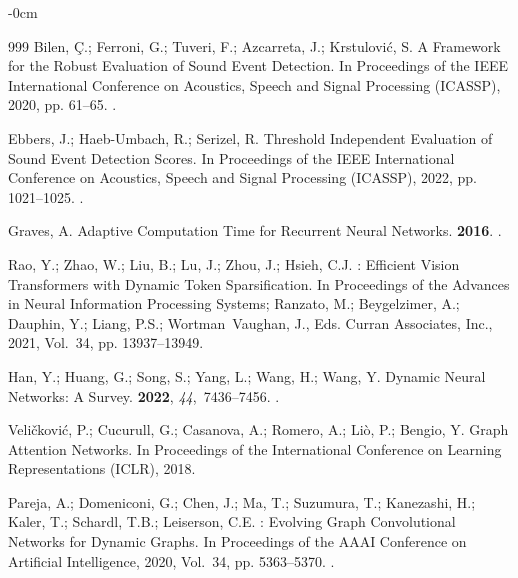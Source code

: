 \documentclass[algorithms,article,submit,pdftex,oneauthor]{Definitions/mdpi}
\begin{document}
\begin{adjustwidth}{-\extralength}{0cm}
\begin{thebibliography}{999}
Bilen, {\c{C}}.; Ferroni, G.; Tuveri, F.; Azcarreta, J.; Krstulovi{\'c}, S.
\newblock A Framework for the Robust Evaluation of Sound Event Detection.
\newblock In Proceedings of the IEEE International Conference on Acoustics,
  Speech and Signal Processing (ICASSP),  2020, pp. 61--65.
.

Ebbers, J.; Haeb-Umbach, R.; Serizel, R.
\newblock Threshold Independent Evaluation of Sound Event Detection Scores.
\newblock In Proceedings of the IEEE International Conference on Acoustics,
  Speech and Signal Processing (ICASSP),  2022, pp. 1021--1025.
.

Graves, A.
\newblock Adaptive Computation Time for Recurrent Neural Networks.
 {\bf 2016}.
.

Rao, Y.; Zhao, W.; Liu, B.; Lu, J.; Zhou, J.; Hsieh, C.J.
: Efficient Vision Transformers with Dynamic Token
  Sparsification.
\newblock In Proceedings of the Advances in Neural Information Processing
  Systems; Ranzato, M.; Beygelzimer, A.; Dauphin, Y.; Liang, P.S.;
  Wortman~Vaughan, J., Eds. Curran Associates, Inc.,  2021, Vol.~34, pp.
  13937--13949.

Han, Y.; Huang, G.; Song, S.; Yang, L.; Wang, H.; Wang, Y.
\newblock Dynamic Neural Networks: A Survey.
  {\bf 2022}, {\em 44},~7436--7456.
.

Veli{\v{c}}kovi{\'c}, P.; Cucurull, G.; Casanova, A.; Romero, A.; Li{\`o}, P.;
  Bengio, Y.
\newblock Graph Attention Networks.
\newblock In Proceedings of the International Conference on Learning
  Representations (ICLR),  2018.

Pareja, A.; Domeniconi, G.; Chen, J.; Ma, T.; Suzumura, T.; Kanezashi, H.;
  Kaler, T.; Schardl, T.B.; Leiserson, C.E.
: Evolving Graph Convolutional Networks for Dynamic
  Graphs.
\newblock In Proceedings of the AAAI Conference on Artificial Intelligence,
  2020, Vol.~34, pp. 5363--5370.
.


\end{thebibliography}
\end{adjustwidth}
\end{document}
